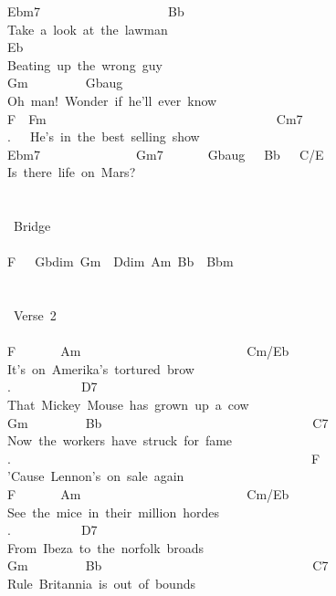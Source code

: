 {Ebm7\ \ \ \ \ \ \ \ \ \ \ \ \ \ \ \ \ \ \ \ Bb\\
Take\ a\ look\ at\ the\ lawman\\
Eb\ \ \ \ \ \ \ \ \ \ \\
Beating\ up\ the\ wrong\ guy\\
Gm\ \ \ \ \ \ \ \ \ Gbaug\\
Oh\ man!\ Wonder\ if\ he'll\ ever\ know\\
F\ \ Fm\ \ \ \ \ \ \ \ \ \ \ \ \ \ \ \ \ \ \ \ \ \ \ \ \ \ \ \ \ \ \ \ \ \ \ \ Cm7\\
.\ \ \ He's\ in\ the\ best\ selling\ show\\
Ebm7\ \ \ \ \ \ \ \ \ \ \ \ \ \ \ Gm7\ \ \ \ \ \ \ Gbaug\ \ \ Bb\ \ \ C/E\\
Is\ there\ life\ on\ Mars?\\
\\
\\
\lbrack\ Bridge\rbrack\\
\\
F\ \ \ Gbdim\ Gm\ \ Ddim\ Am\ Bb\ \ Bbm\\
\\
\\
\lbrack\ Verse\ 2\rbrack\\
\\
F\ \ \ \ \ \ \ Am\ \ \ \ \ \ \ \ \ \ \ \ \ \ \ \ \ \ \ \ \ \ \ \ \ \ Cm/Eb\\
It's\ on\ Amerika's\ tortured\ brow\\
.\ \ \ \ \ \ \ \ \ \ \ D7\\
That\ Mickey\ Mouse\ has\ grown\ up\ a\ cow\\
Gm\ \ \ \ \ \ \ \ \ Bb\ \ \ \ \ \ \ \ \ \ \ \ \ \ \ \ \ \ \ \ \ \ \ \ \ \ \ \ \ \ \ \ \ C7\\
Now\ the\ workers\ have\ struck\ for\ fame\\
.\ \ \ \ \ \ \ \ \ \ \ \ \ \ \ \ \ \ \ \ \ \ \ \ \ \ \ \ \ \ \ \ \ \ \ \ \ \ \ \ \ \ \ \ \ \ \ F\\
'Cause\ Lennon's\ on\ sale\ again\\
F\ \ \ \ \ \ \ Am\ \ \ \ \ \ \ \ \ \ \ \ \ \ \ \ \ \ \ \ \ \ \ \ \ \ Cm/Eb\\
See\ the\ mice\ in\ their\ million\ hordes\\
.\ \ \ \ \ \ \ \ \ \ \ D7\\
From\ Ibeza\ to\ the\ norfolk\ broads\\
Gm\ \ \ \ \ \ \ \ \ Bb\ \ \ \ \ \ \ \ \ \ \ \ \ \ \ \ \ \ \ \ \ \ \ \ \ \ \ \ \ \ \ \ \ C7\\
Rule\ Britannia\ is\ out\ of\ bounds\\
}
